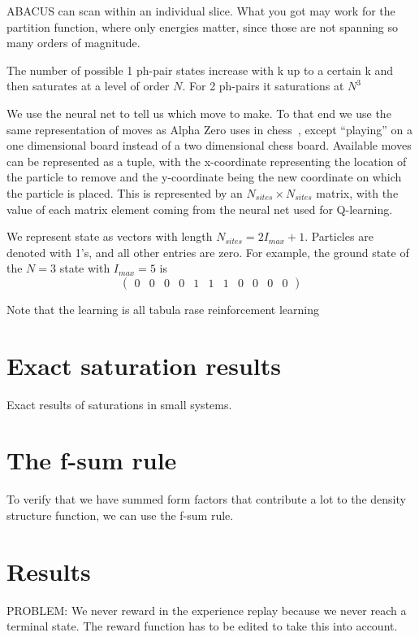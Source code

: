 \documentclass[11pt, a4paper]{report} %
\begin{document}
ABACUS can scan within an individual slice.
What you got may work for the partition function, where only energies matter, since those are not spanning so many orders of magnitude.

The number of possible 1 ph-pair states increase with k up to a certain k and then saturates at a level of order $N$.
For 2 ph-pairs it saturations at $N^3$

We use the neural net to tell us which move to make.
To that end we use the same representation of moves as Alpha Zero uses in chess~\cite{Silver2017}, except ``playing'' on a one dimensional board instead of a two dimensional chess board.
Available moves can be represented as a tuple, with the x-coordinate representing the location of the particle to remove and the y-coordinate being the new coordinate on which the particle is placed.
This is represented by an $N_{sites} \times N_{sites}$ matrix, with the value of each matrix element coming from the neural net used for Q-learning.

We represent state as vectors with length $N_{sites} = 2 I_{max} + 1$.
Particles are denoted with 1's, and all other entries are zero.
For example, the ground state of the $N=3$ state with $I_{max} = 5$ is 
\begin{equation}
  \begin{pmatrix} 0 & 0 & 0 & 0 & 1 & 1 & 1 & 0 & 0 & 0 & 0 \end{pmatrix}
\end{equation}

Note that the learning is all tabula rase reinforcement learning

\section{Exact saturation results}

Exact results of saturations in small systems.

\section{The f-sum rule}
To verify that we have summed form factors that contribute a lot to the density structure function, we can use the f-sum rule.

\section{Results}

PROBLEM: We never reward in the experience replay because we never reach a terminal state. The reward function has to be edited to take this into account.
\end{document}
